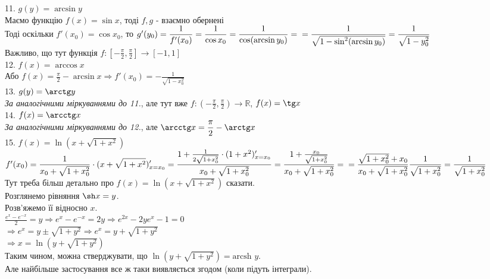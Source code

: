 \documentclass[a4paper, 14pt]{article}
\def\huge{\displaystyle}
\theoremstyle{theoremdd}
\theoremstyle{theoremdd}
\theoremstyle{theoremdd}
\theoremstyle{theoremdd}
\theoremstyle{theoremdd}
\theoremstyle{theoremdd}
\theoremstyle{theoremdd}
\theoremstyle{theoremdd}
\begin{document}
11. $g(y) = \arcsin y$\\
Маємо функцію $f(x) = \sin x$, тоді $f,g$ - взаємно обернені\\
Тоді оскільки $f'(x_0) = \cos x_0$, то $g'(y_0) = \huge \frac{1}{f'(x_0)} = \frac{1}{\cos x_0}= \frac{1}{\cos (\arcsin y_0)} = \\ = \frac{1}{\sqrt{1- \sin^2(\arcsin y_0)}} = \frac{1}{\sqrt{1-y_0^2}}$\\
Важливо, що тут функція $f: \huge \left[-\frac{\pi}{2},\frac{\pi}{2}\right] \to [-1,1]$
\bigskip \\

12. $f(x) = \arccos x$\\
Або $f(x) = \huge \frac{\pi}{2} - \arcsin x \Rightarrow f'(x_0) = - \frac{1}{\sqrt{1-x_0^2}}$
\bigskip \\

13. $g(y) = \arctg y$\\
\textit{За аналогічними міркуваннями до 11.}, але тут вже $f: \huge \left(-\frac{\pi}{2},\frac{\pi}{2}\right) \to \mathbb{R}$, $f(x) = \tg x$
\bigskip \\

14. $f(x) = \arcctg x$\\
\textit{За аналогічними міркуваннями до 12.}, але $\arcctg x = \huge \frac{\pi}{2} - \arctg x$
\bigskip \\

15. $f(x) = \ln(x + \sqrt{1+x^2})$\\
$f'(x_0) = \huge \frac{1}{x_0+ \sqrt{1+x_0^2}} \cdot (x+ \sqrt{1+x^2})'_{x = x_0} = \frac{1+ \frac{1}{2\sqrt{1+x_0^2}} \cdot (1+x^2)'_{x=x_0}}{x_0+ \sqrt{1+x_0^2}} = \frac{1+ \frac{x_0}{\sqrt{1+x_0^2}}}{x_0 + \sqrt{1+x_0^2}} = \\ = \frac{\sqrt{1+x_0^2}+x_0}{x_0 + \sqrt{1 + x_0^2}} \frac{1}{\sqrt{1+x_0^2}} = \frac{1}{\sqrt{1+x_0^2}}$
\bigskip \\

Тут треба більш детально про $f(x) = \ln(x+\sqrt{1+x^2})$ сказати.\\
Розглянемо рівняння $\sh x = y$.\\
Розв'яжемо її відносно $x$.\\
$\huge \frac{e^x-e^{-x}}{2} = y \Rightarrow e^x-e^{-x}=2y \Rightarrow e^{2x}- 2y e^x - 1 = 0$\\
$\Rightarrow e^x = y \pm \sqrt{1+y^2} \Rightarrow e^x = y + \sqrt{1+y^2}$\\
$\Rightarrow x = \ln(y + \sqrt{1+y^2})$\\
Таким чином, можна стверджувати, що $\ln(y+\sqrt{1+y^2}) = \textrm{arcsh } y$.\\
Але найбільше застосування все ж таки виявляється згодом (коли підуть інтеграли).
\end{document}
